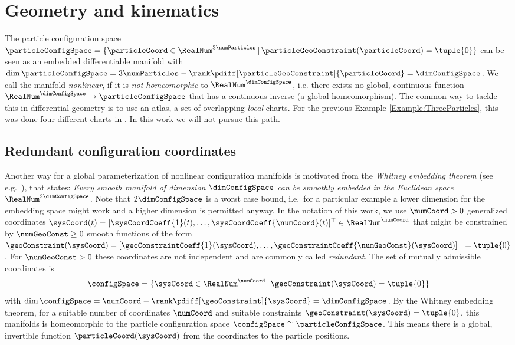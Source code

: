 \section{Geometry and kinematics}\label{sec:AnaMechGeometry}
The particle configuration space $\particleConfigSpace = \{ \particleCoord \in \RealNum^{3\numParticles} \, | \, \particleGeoConstraint(\particleCoord) = \tuple{0} \}$ can be seen as an embedded differentiable manifold with $\dim\particleConfigSpace = 3\numParticles - \rank\pdiff[\particleGeoConstraint]{\particleCoord} = \dimConfigSpace$.
We call the manifold \textit{nonlinear}, if it is \textit{not homeomorphic} to $\RealNum^{\dimConfigSpace}$, i.e. there exists no global, continuous function $\RealNum^{\dimConfigSpace} \rightarrow \particleConfigSpace$ that has a continuous inverse (a global homeomorphism).
The common way to tackle this in differential geometry is to use an atlas, a set of overlapping \textit{local} charts.
For the previous Example \ref{Example:ThreeParticles}, this was done four different charts in \cite{Grafarend:AtlasSO3}.
In this work we will not pursue this path.

\subsection{Redundant configuration coordinates}
Another way for a global parameterization of nonlinear configuration manifolds is motivated from the \textit{Whitney embedding theorem} (see e.g.\ \cite[Theo.\,6.14]{Lee:SmoothManifolds}), that states: \textit{Every smooth manifold of dimension $\dimConfigSpace$ can be smoothly embedded in the Euclidean space $\RealNum^{2\dimConfigSpace}$.}
Note that $2\dimConfigSpace$ is a worst case bound, i.e.\ for a particular example a lower dimension for the embedding space might work and a higher dimension is permitted anyway.
In the notation of this work, we use $\numCoord > 0$ generalized coordinates $\sysCoord(t) = [\sysCoordCoeff{1}(t),\ldots,\sysCoordCoeff{\numCoord}(t)]^\top \in \RealNum^\numCoord$ that might be constrained by $\numGeoConst \geq 0$ smooth functions of the form $\geoConstraint(\sysCoord) = [\geoConstraintCoeff{1}(\sysCoord), \ldots, \geoConstraintCoeff{\numGeoConst}(\sysCoord)]^\top = \tuple{0}$.
For $\numGeoConst > 0$ these coordinates are not independent and are commonly called \textit{redundant}.
The set of mutually admissible coordinates is
\begin{align}
 \configSpace = \{ \sysCoord \in \RealNum^{\numCoord} \, | \, \geoConstraint(\sysCoord) = \tuple{0} \}
\end{align}
with $\dim \configSpace = \numCoord - \rank \pdiff[\geoConstraint]{\sysCoord} = \dimConfigSpace$.
By the Whitney embedding theorem, for a suitable number of coordinates $\numCoord$ and suitable constraints $\geoConstraint(\sysCoord) = \tuple{0}$, this manifolds is homeomorphic to the particle configuration space $\configSpace \cong \particleConfigSpace$.
This means there is a global, invertible function $\particleCoord(\sysCoord)$ from the coordinates to the particle positions.

